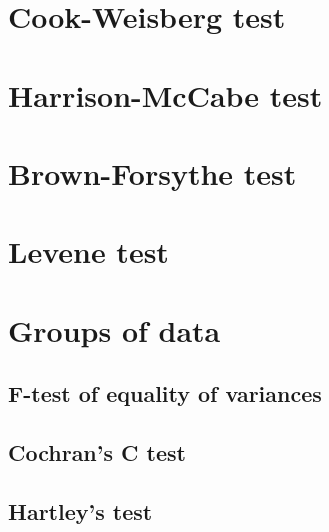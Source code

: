 \section{Cook-Weisberg test}

\section{Harrison-McCabe test}

\section{Brown-Forsythe test}

\section{Levene test}


\section{Groups of data}

\subsection{F-test of equality of variances}

\subsection{Cochran's C test}

\subsection{Hartley's test}

